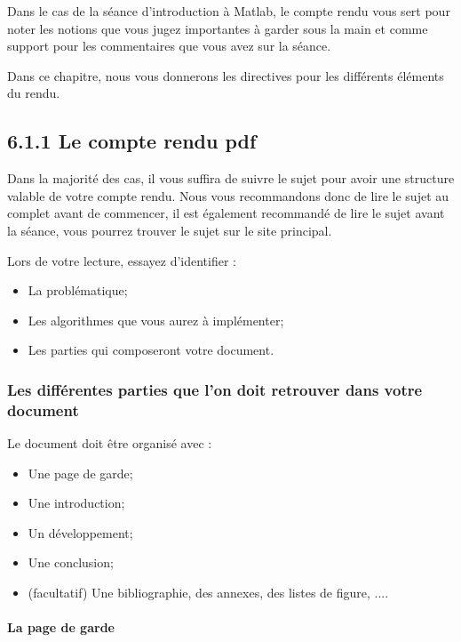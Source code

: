 \documentclass[11pt]{article}
\providecommand{\tightlist}{%
      \setlength{\itemsep}{0pt}\setlength{\parskip}{0pt}}
\begin{document}
Dans le cas de la séance d'introduction à Matlab, le compte rendu vous
sert pour noter les notions que vous jugez importantes à garder sous la
main et comme support pour les commentaires que vous avez sur la séance.

Dans ce chapitre, nous vous donnerons les directives pour les différents
éléments du rendu.

    \subsection{6.1.1 Le compte rendu pdf}\label{le-compte-rendu-pdf}

Dans la majorité des cas, il vous suffira de suivre le sujet pour avoir
une structure valable de votre compte rendu. Nous vous recommandons donc
de lire le sujet au complet avant de commencer, il est également
recommandé de lire le sujet avant la séance, vous pourrez trouver le
sujet sur le site principal.

Lors de votre lecture, essayez d'identifier :

\begin{itemize}
\tightlist
\item
  La problématique;
\item
  Les algorithmes que vous aurez à implémenter;
\item
  Les parties qui composeront votre document.
\end{itemize}

\subsubsection{Les différentes parties que l'on doit retrouver dans
votre
document}\label{les-diffuxe9rentes-parties-que-lon-doit-retrouver-dans-votre-document}

Le document doit être organisé avec :

\begin{itemize}
\tightlist
\item
  Une page de garde;
\item
  Une introduction;
\item
  Un développement;
\item
  Une conclusion;
\item
  (facultatif) Une bibliographie, des annexes, des listes de figure,
  ....
\end{itemize}

\paragraph{La page de garde}\label{la-page-de-garde}
\end{document}
